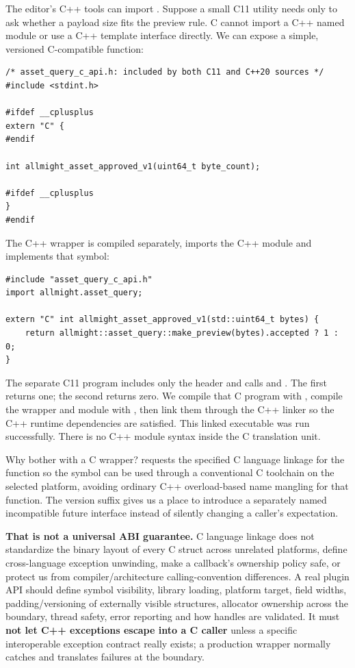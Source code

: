 \hypertarget{05-engine-i-ch006-a-c-linkage-wrapper-makes-a-narrower-promise-than-a-c-template-api}{}

The editor's C++ tools can import . Suppose a small C11 utility needs only to ask whether a payload size fits the preview rule. C cannot import a C++ named module or use a C++ template interface directly. We can expose a simple, versioned C-compatible function:

\begin{verbatim}
/* asset_query_c_api.h: included by both C11 and C++20 sources */
#include <stdint.h>

#ifdef __cplusplus
extern "C" {
#endif

int allmight_asset_approved_v1(uint64_t byte_count);

#ifdef __cplusplus
}
#endif
\end{verbatim}

The C++ wrapper is compiled separately, imports the C++ module and implements that symbol:

\begin{verbatim}
#include "asset_query_c_api.h"
import allmight.asset_query;

extern "C" int allmight_asset_approved_v1(std::uint64_t bytes) {
    return allmight::asset_query::make_preview(bytes).accepted ? 1 : 0;
}
\end{verbatim}

The separate C11 program includes only the header and calls  and . The first returns one; the second returns zero. We compile that C program with , compile the wrapper and module with , then link them through the C++ linker so the C++ runtime dependencies are satisfied. This linked executable was run successfully. There is no C++ module syntax inside the C translation unit.

Why bother with a C wrapper?  requests the specified C language linkage for the function so the symbol can be used through a conventional C toolchain on the selected platform, avoiding ordinary C++ overload-based name mangling for that function. The version suffix  gives us a place to introduce a separately named incompatible future interface instead of silently changing a caller's expectation.

\textbf{That is not a universal ABI guarantee.} C language linkage does not standardize the binary layout of every C struct across unrelated platforms, define cross-language exception unwinding, make a callback's ownership policy safe, or protect us from compiler/architecture calling-convention differences. A real plugin API should define symbol visibility, library loading, platform target, field widths, padding/versioning of externally visible structures, allocator ownership across the boundary, thread safety, error reporting and how handles are validated. It must \textbf{not let C++ exceptions escape into a C caller} unless a specific interoperable exception contract really exists; a production wrapper normally catches and translates failures at the boundary.

